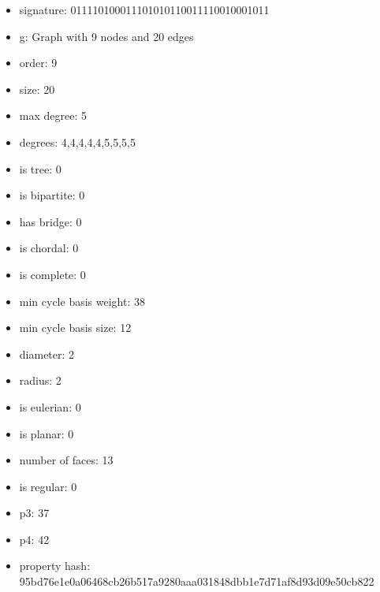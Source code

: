 \newpage
\begin{figure}
\end{figure}
\begin{itemize}
\item signature: 011110100011101010110011110010001011
\item g: Graph with 9 nodes and 20 edges
\item order: 9
\item size: 20
\item max degree: 5
\item degrees: 4,4,4,4,4,5,5,5,5
\item is tree: 0
\item is bipartite: 0
\item has bridge: 0
\item is chordal: 0
\item is complete: 0
\item min cycle basis weight: 38
\item min cycle basis size: 12
\item diameter: 2
\item radius: 2
\item is eulerian: 0
\item is planar: 0
\item number of faces: 13
\item is regular: 0
\item p3: 37
\item p4: 42
\item property hash: 95bd76e1e0a06468cb26b517a9280aaa031848dbb1e7d71af8d93d09e50cb822
\end{itemize}
